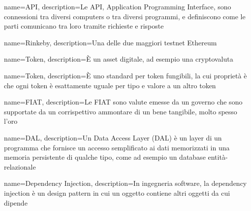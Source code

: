 {
  name={API},
  description={Le API, Application Programming Interface, sono connessioni tra diversi computers o tra diversi programmi, e definiscono come le parti comunicano tra loro tramite richieste e risposte}
}

{
  name={Rinkeby},
  description={Una delle due maggiori testnet\glo{} Ethereum}
}

{
  name={Token},
  description={È un asset digitale, ad esempio una cryptovaluta}
}

{
  name={Token},
  description={È uno standard per token fungibili, la cui proprietà è che ogni token è esattamente uguale per tipo e valore a un altro token}
}

{
  name={FIAT},
  description={Le FIAT sono valute emesse da un governo che sono supportate da un corrispettivo ammontare di un bene tangibile, molto spesso l'oro}
}

{
  name={DAL},
  description={Un Data Access Layer (DAL) è un layer di un programma che fornisce un accesso semplificato ai dati memorizzati in una memoria persistente di qualche tipo, come ad esempio un database entità-relazionale}
}

{
  name={Dependency Injection},
  description={In ingegneria software, la dependency injection è un design pattern in cui un oggetto contiene altri oggetti da cui dipende}
}